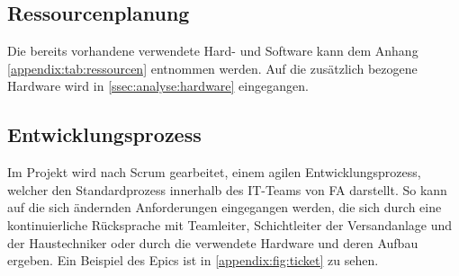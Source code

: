 \subsection{Ressourcenplanung}

Die bereits vorhandene verwendete Hard- und Software kann dem Anhang \vref{appendix:tab:ressourcen} entnommen werden. Auf die zusätzlich bezogene Hardware wird in \vref{ssec:analyse:hardware} eingegangen.


\subsection{Entwicklungsprozess}

Im Projekt wird nach Scrum gearbeitet, einem agilen Entwicklungsprozess, welcher den Standardprozess innerhalb des IT-Teams von \ac{FA} darstellt. So kann auf die sich ändernden Anforderungen eingegangen werden, die sich durch eine kontinuierliche Rücksprache mit Teamleiter, Schichtleiter der Versandanlage und der Haustechniker oder durch die verwendete Hardware und deren Aufbau ergeben. Ein Beispiel des Epics ist in \vref{appendix:fig:ticket} zu sehen.


